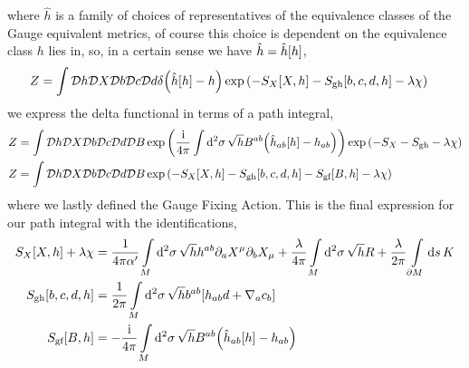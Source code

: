 where $\hat h$ is a family of choices of representatives of the equivalence classes of the Gauge equivalent metrics, of course this choice is 
dependent on the equivalence class $h$ lies in, so, in a certain sense we have $\hat h=\hat h\qty[h]$,
\begin{align*}
    Z&=\int\mathcal D h\mathcal D X\mathcal D b\mathcal D c\mathcal D d\delta\qty(\hat h\qty[h]-h)\exp\qty(-S_X\qty[X, h]-S_{\textnormal{gh}}\qty[b,c,d,h]-\lambda\chi)
\end{align*}
we express the delta functional in terms of a path integral,
\begin{align*}
    Z&=\int\mathcal D h\mathcal D X\mathcal D b\mathcal D c\mathcal D d\mathcal D B\exp\qty(\frac{\textnormal{i}}{4\pi}\int\dd[2]{\sigma}\sqrt{h}B^{ab}\qty(\hat h_{ab}\qty[h]-h_{ab}))\exp\qty(-S_X-S_{\textnormal{gh}}-\lambda\chi)\\
    Z&=\int\mathcal D h\mathcal D X\mathcal D b\mathcal D c\mathcal D d\mathcal D B\exp\qty(-S_X\qty[X, h]-S_{\textnormal{gh}}\qty[b,c,d,h]-S_{\textnormal{gf}}\qty[B,h]-\lambda\chi)
\end{align*}
where we lastly defined the Gauge Fixing Action. This is the final expression for our path integral with the identifications,
\begin{subequations}\label{actions}
\begin{align}
    S_X\qty[X, h]+\lambda\chi&=\frac{1}{4\pi\alpha'}\int\limits_M\dd[2]{\sigma}\sqrt{h}h^{ab}\partial_a X^\mu\partial_b X_\mu+\frac\lambda{4\pi}\int\limits_M\dd[2]{\sigma}\sqrt{h}R+\frac\lambda{2\pi}\int\limits_{\partial M}\dd{s}K\\
    S_{\textnormal{gh}}\qty[b,c,d,h]&=\frac{1}{2\pi}\int\limits_M\dd[2]{\sigma}\sqrt{h}b^{ab}\qty[h_{ab}d+\nabla_{a}c_b]\\
    S_{\textnormal{gf}}\qty[B,h]&=-\frac{\textnormal{i}}{4\pi}\int\limits_M\dd[2]{\sigma}\sqrt{h}B^{ab}\qty(\hat h_{ab}\qty[h]-h_{ab})
\end{align}
\end{subequations}